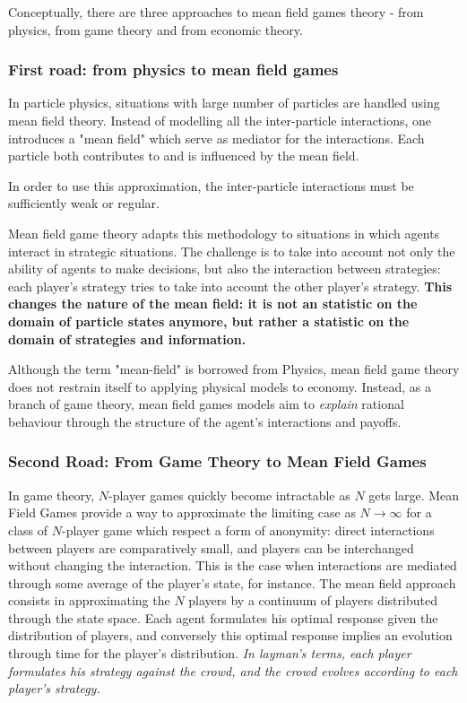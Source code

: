 \documentclass{article}
\begin{document}
Conceptually, there are three approaches to mean field games theory - from physics, from game theory and from economic theory.

\subsubsection{First road: from physics to mean field games}

In particle physics, situations with large number of particles are handled using mean field theory. Instead of modelling all the inter-particle interactions, one introduces a "mean field" which serve as mediator for the interactions. Each particle both contributes to and is influenced by the mean field.

In order to use this approximation, the inter-particle interactions must be sufficiently weak or regular.

Mean field game theory adapts this methodology to situations in which agents interact in strategic situations. The challenge is to take into account not only the ability of agents to make decisions, but also the interaction between strategies: each player's strategy tries to take into account the other player's strategy.
\textbf{This changes the nature of the mean field: it is not an statistic on the domain of particle states anymore, but rather a statistic on the domain of strategies and information.}

Although the term "mean-field" is borrowed from Physics, mean field game theory does not restrain itself to applying physical models to economy. Instead, as a branch of game theory, mean field games models aim to \textit{explain} rational behaviour through the structure of the agent's interactions and payoffs. \cite{cousin2010paris}

\subsubsection{Second Road: From Game Theory to Mean Field Games}

In game theory, $N$-player games quickly become intractable as $N$ gets large. Mean Field Games provide a way to approximate the limiting case as $N \to \infty$ for a class of $N$-player game which respect a form of anonymity: direct interactions between players are comparatively small, and players can be interchanged without changing the interaction. This is the case when interactions are mediated through some average of the player's state, for instance.
The mean field approach consists in approximating the $N$ players by a continuum of players distributed through the state space. Each agent formulates his optimal response given the distribution of players, and conversely this optimal response implies an evolution through time for the player's distribution.
\textit{In layman's terms, each player formulates his strategy against the crowd, and the crowd evolves according to each player's strategy.}
\end{document}
